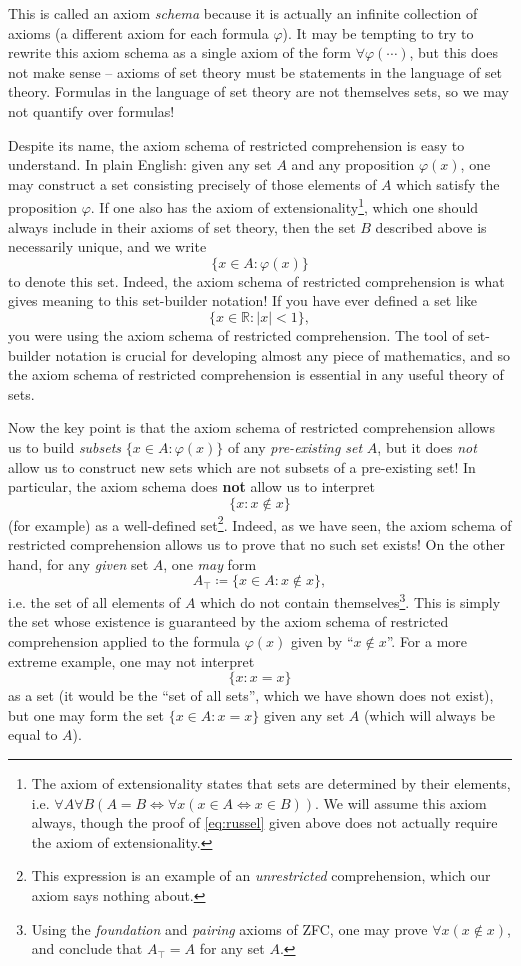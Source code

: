 This is called an axiom \emph{schema} because it is actually an infinite collection of axioms (a different axiom for each formula $\varphi$). It may be tempting to try to rewrite this axiom schema as a single axiom of the form $\forall \varphi(\cdots)$, but this does not make sense -- axioms of set theory must be statements in the language of set theory. Formulas in the language of set theory are not themselves sets, so we may not quantify over formulas!

Despite its name, the axiom schema of restricted comprehension is easy to understand. In plain English: given any set $A$ and any proposition $\varphi(x)$, one may construct a set consisting precisely of those elements of $A$ which satisfy the proposition $\varphi$. If one also has the axiom of extensionality\footnote{The axiom of extensionality states that sets are determined by their elements, i.e. $\forall A \forall B (A = B \iff \forall x (x \in A \iff x \in B))$. We will assume this axiom always, though the proof of \eqref{eq:russel} given above does not actually require the axiom of extensionality.}, which one should always include in their axioms of set theory, then the set $B$ described above is necessarily unique, and we write
\[\{x \in A : \varphi(x)\}\]
to denote this set. Indeed, the axiom schema of restricted comprehension is what gives meaning to this set-builder notation! If you have ever defined a set like
\[\{x \in \mathbb{R} : \lvert x \rvert < 1\},\]
you were using the axiom schema of restricted comprehension. The tool of set-builder notation is crucial for developing almost any piece of mathematics, and so the axiom schema of restricted comprehension is essential in any useful theory of sets.

Now the key point is that the axiom schema of restricted comprehension allows us to build \emph{subsets} $\{x \in A : \varphi(x)\}$ of any \emph{pre-existing set} $A$, but it does \emph{not} allow us to construct new sets which are not subsets of a pre-existing set! In particular, the axiom schema does \textbf{not} allow us to interpret
\[\{x : x \notin x\}\]
(for example) as a well-defined set\footnote{This expression is an example of an \emph{unrestricted} comprehension, which our axiom says nothing about.}. Indeed, as we have seen, the axiom schema of restricted comprehension allows us to prove that no such set exists! On the other hand, for any \emph{given} set $A$, one \emph{may} form
\[A_\top \coloneq \{x \in A : x \notin x\},\]
i.e. the set of all elements of $A$ which do not contain themselves\footnote{Using the \emph{foundation} and \emph{pairing} axioms of ZFC, one may prove $\forall x (x \notin x)$, and conclude that $A_\top = A$ for any set $A$.}. This is simply the set whose existence is guaranteed by the axiom schema of restricted comprehension applied to the formula $\varphi(x)$ given by ``$x \notin x$''. For a more extreme example, one may not interpret
\[\{x : x = x\}\]
as a set (it would be the ``set of all sets'', which we have shown does not exist), but one may form the set $\{x \in A : x = x\}$ given any set $A$ (which will always be equal to $A$).

